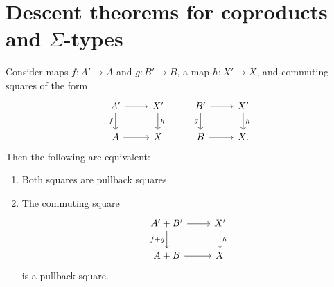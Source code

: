 \section{Descent theorems for coproducts and \texorpdfstring{$\Sigma$}{Σ}-types}

\begin{thm}
Consider maps $f:A'\to A$ and $g:B'\to B$, a map $h:X'\to X$, and commuting squares of the form
\begin{equation*}
\begin{tikzcd}
A' \arrow[r] \arrow[d,swap,"f"] & X' \arrow[d,"h"] & B' \arrow[r] \arrow[d,swap,"g"] & X' \arrow[d,"h"] \\
A \arrow[r] & X & B \arrow[r] & X.
\end{tikzcd}
\end{equation*}
Then the following are equivalent:
\begin{enumerate}
\item Both squares are pullback squares.
\item The commuting square 
\begin{equation*}
\begin{tikzcd}
A'+B' \arrow[d,swap,"f+g"] \arrow[r] & X' \arrow[d,"h"] \\
A+B \arrow[r] & X
\end{tikzcd}
\end{equation*}
is a pullback square.
\end{enumerate}
\end{thm}

